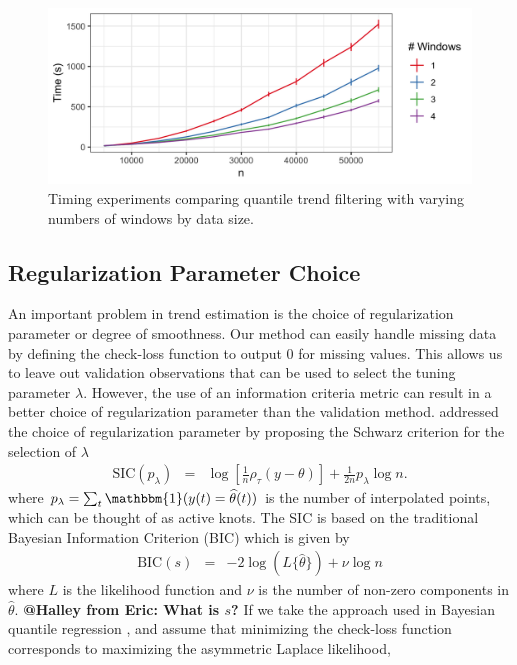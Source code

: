 \documentclass[12pt]{article}
\makeatletter
\newcommand{\Halley}[2]{{\bf {\color{purple}@Halley from #1: #2}}\xspace}
\newcommand{\One}{\mathbbm{1}}
\makeatother
\begin{document}
	\begin{figure}[!h] 
		\centering
		\includegraphics[width = 0.7\linewidth]{Figures/Fig_timing_experiment.png}
		\caption{Timing experiments comparing quantile trend filtering with varying numbers of windows by data size.}
		\label{fig:timing}
	\end{figure}

	\subsection{Regularization Parameter Choice}
	\label{sec:lambda_choice}
	An important problem in trend estimation is the choice of regularization parameter or degree of smoothness. Our method can easily handle missing data by defining the check-loss function to output 0 for missing values. This allows us to leave out validation observations that can be used to select the tuning parameter $\lambda$. However, the use of an information criteria metric can result in a better choice of regularization parameter than the validation method.  \cite{KoenkerNgPortnoy1994} addressed the choice of regularization parameter by proposing the Schwarz criterion for the selection of $\lambda$
	\begin{eqnarray*}
	\label{eq:SIC}
	\mbox{SIC}(p_{\lambda}) & = & \log\left[\frac{1}{n}\rho_{\tau}(y - \theta)\right] + \frac{1}{2n}p_{\lambda}\log n.
	\end{eqnarray*}
	where $p_{\lambda} = \sum_t \One(y(t) = \widehat{\theta}(t))$ is the number of interpolated points, which can be thought of as active knots. The SIC is based on the traditional Bayesian Information Criterion (BIC) which is given by 
	\begin{eqnarray*}
	\mbox{BIC}(s) & = & -2\log(L\{\hat{\theta}\}) + \nu\log n 
	\end{eqnarray*}	
	where $L$ is the likelihood function and $\nu$ is the number of non-zero components in $\hat{\theta}$. \Halley{Eric}{What is $s$?} If we take the approach used in Bayesian quantile regression \citep{yu2001bayesian}, and assume that minimizing the check-loss function corresponds to maximizing the asymmetric Laplace likelihood, 
\end{document}
